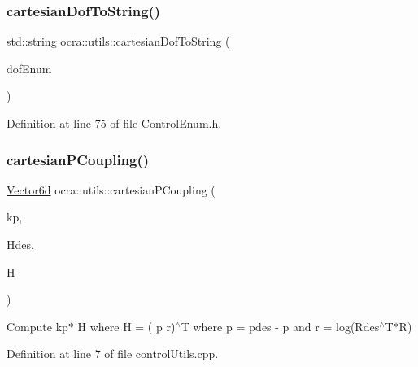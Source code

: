 \hypertarget{namespaceocra_1_1utils_a5e098489ff3bc369635762ab1a208b0e}{}\label{namespaceocra_1_1utils_a5e098489ff3bc369635762ab1a208b0e} 
\subsubsection{\texorpdfstring{cartesian\+Dof\+To\+String()}{cartesianDofToString()}}
{\footnotesize\ttfamily std\+::string ocra\+::utils\+::cartesian\+Dof\+To\+String (\begin{DoxyParamCaption}\item[{const \hyperlink{namespaceocra_a436781c7059a0f76027df1c652126260}{E\+Cartesian\+Dof}}]{dof\+Enum }\end{DoxyParamCaption})\hspace{0.3cm}{\ttfamily [inline]}}



Definition at line 75 of file Control\+Enum.\+h.

\hypertarget{namespaceocra_1_1utils_aef5a7c74e8cfa9b803cd2a18d6401d1d}{}\label{namespaceocra_1_1utils_aef5a7c74e8cfa9b803cd2a18d6401d1d} 
\subsubsection{\texorpdfstring{cartesian\+P\+Coupling()}{cartesianPCoupling()}}
{\footnotesize\ttfamily \hyperlink{namespaceocra_a72fe7d6cf8411efbfc475a3a78209867}{Vector6d} ocra\+::utils\+::cartesian\+P\+Coupling (\begin{DoxyParamCaption}\item[{const Eigen\+::\+Matrix$<$ double, 6, 1 $>$ \&}]{kp,  }\item[{const Eigen\+::\+Displacementd \&}]{Hdes,  }\item[{const Eigen\+::\+Displacementd \&}]{H }\end{DoxyParamCaption})}

Compute kp$\ast$ H where  H = ( p  r)$^\wedge$T where  p = pdes -\/ p and  r = log(\+Rdes$^\wedge$\+T$\ast$\+R) 

Definition at line 7 of file control\+Utils.\+cpp.

\hypertarget{namespaceocra_1_1utils_a2253567d0df64a629bad3bdb7e2bd30b}{}\label{namespaceocra_1_1utils_a2253567d0df64a629bad3bdb7e2bd30b} 
